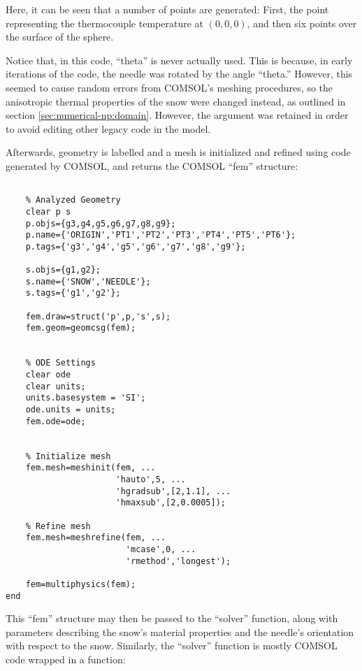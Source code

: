 Here, it can be seen that a number of points are generated: First, the point
representing the thermocouple temperature at \((0, 0, 0)\), and then six points
over the surface of the sphere.

Notice that, in this code, ``theta'' is never actually used. This is
because, in early iterations of the code, the needle was rotated by the angle
``theta.'' However, this seemed to cause random errors from COMSOL's meshing
procedures, so the anisotropic thermal properties of the snow were changed
instead, as outlined in section \ref{sec:numerical-np:domain}. However, the
argument was retained in order to avoid editing other legacy code in the model.

Afterwards, geometry is labelled and a mesh is initialized and refined using
code generated by COMSOL, and returns the COMSOL ``fem'' structure:

\small
\begin{verbatim}

    % Analyzed Geometry
    clear p s
    p.objs={g3,g4,g5,g6,g7,g8,g9};
    p.name={'ORIGIN','PT1','PT2','PT3','PT4','PT5','PT6'};
    p.tags={'g3','g4','g5','g6','g7','g8','g9'};

    s.objs={g1,g2};
    s.name={'SNOW','NEEDLE'};
    s.tags={'g1','g2'};

    fem.draw=struct('p',p,'s',s);
    fem.geom=geomcsg(fem);


    % ODE Settings
    clear ode
    clear units;
    units.basesystem = 'SI';
    ode.units = units;
    fem.ode=ode;


    % Initialize mesh
    fem.mesh=meshinit(fem, ...
                      'hauto',5, ...
                      'hgradsub',[2,1.1], ...
                      'hmaxsub',[2,0.0005]);

    % Refine mesh
    fem.mesh=meshrefine(fem, ...
                        'mcase',0, ...
                        'rmethod','longest');

    fem=multiphysics(fem);
end
\end{verbatim}
\normalsize

This ``fem'' structure may then be passed to the ``solver'' function, along
with parameters describing the snow's material properties and the needle's
orientation with respect to the snow. Similarly, the ``solver'' function is
mostly COMSOL code wrapped in a function:

